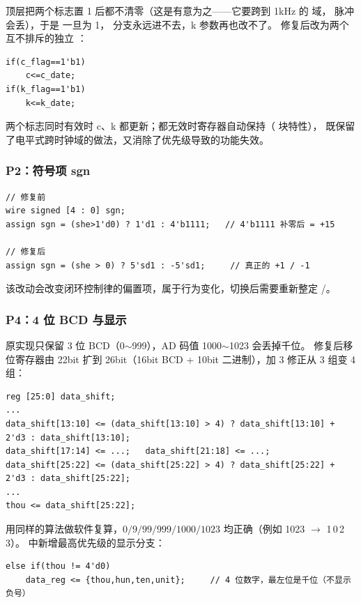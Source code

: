 顶层把两个标志置 1 后都不清零（这是有意为之——它要跨到 1kHz 的  域，
脉冲会丢），于是  一旦为 1， 分支永远进不去，k 参数再也改不了。
修复后改为两个互不排斥的独立 ：

\begin{lstlisting}[style=vsnip]
if(c_flag==1'b1)
    c<=c_date;
if(k_flag==1'b1)
    k<=k_date;
\end{lstlisting}

两个标志同时有效时 c、k 都更新；都无效时寄存器自动保持（ 块特性），
既保留了电平式跨时钟域的做法，又消除了优先级导致的功能失效。

\subsubsection{P2：符号项 sgn}

\begin{lstlisting}[style=vsnip]
// 修复前
wire signed [4 : 0] sgn;
assign sgn = (she>1'd0) ? 1'd1 : 4'b1111;   // 4'b1111 补零后 = +15

// 修复后
assign sgn = (she > 0) ? 5'sd1 : -5'sd1;     // 真正的 +1 / -1
\end{lstlisting}

该改动会改变闭环控制律的偏置项，属于行为变化，切换后需要重新整定 /。

\subsubsection{P4：4 位 BCD 与显示}

原实现只保留 3 位 BCD（0$\sim$999），AD 码值 1000$\sim$1023 会丢掉千位。
修复后移位寄存器由 22bit 扩到 26bit（16bit BCD + 10bit 二进制），加 3 修正从 3 组变 4 组：

\begin{lstlisting}[style=vsnip]
reg [25:0] data_shift;
...
data_shift[13:10] <= (data_shift[13:10] > 4) ? data_shift[13:10] + 2'd3 : data_shift[13:10];
data_shift[17:14] <= ...;   data_shift[21:18] <= ...;
data_shift[25:22] <= (data_shift[25:22] > 4) ? data_shift[25:22] + 2'd3 : data_shift[25:22];
...
thou <= data_shift[25:22];
\end{lstlisting}

用同样的算法做软件复算，$0/9/99/999/1000/1023$ 均正确（例如 1023 $\rightarrow$ 1\,0\,2\,3）。
 中新增最高优先级的显示分支：

\begin{lstlisting}[style=vsnip]
else if(thou != 4'd0)
    data_reg <= {thou,hun,ten,unit};     // 4 位数字，最左位是千位（不显示负号）
\end{lstlisting}

